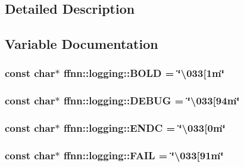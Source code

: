 \subsection{Detailed Description}


\subsection{Variable Documentation}
\hypertarget{group___unicode_color_definitions_ga32fca3fc24af93ce9c4ca33b4a6a3dde}{
\subsubsection[{B\-O\-L\-D}]{\setlength{\rightskip}{0pt plus 5cm}const char$\ast$ ffnn\-::logging\-::\-B\-O\-L\-D = \char`\"{}\textbackslash{}033\mbox{[}1m\char`\"{}}}\label{group___unicode_color_definitions_ga32fca3fc24af93ce9c4ca33b4a6a3dde}
\hypertarget{group___unicode_color_definitions_ga359f39576675d57a59f93e2addae319a}{
\subsubsection[{D\-E\-B\-U\-G}]{\setlength{\rightskip}{0pt plus 5cm}const char$\ast$ ffnn\-::logging\-::\-D\-E\-B\-U\-G = \char`\"{}\textbackslash{}033\mbox{[}94m\char`\"{}}}\label{group___unicode_color_definitions_ga359f39576675d57a59f93e2addae319a}
\hypertarget{group___unicode_color_definitions_gab21e47dcbc216f8fc7de88bd217f9f0a}{
\subsubsection[{E\-N\-D\-C}]{\setlength{\rightskip}{0pt plus 5cm}const char$\ast$ ffnn\-::logging\-::\-E\-N\-D\-C = \char`\"{}\textbackslash{}033\mbox{[}0m\char`\"{}}}\label{group___unicode_color_definitions_gab21e47dcbc216f8fc7de88bd217f9f0a}
\hypertarget{group___unicode_color_definitions_ga2047db0e31e0a45c7c213845567afc06}{
\subsubsection[{F\-A\-I\-L}]{\setlength{\rightskip}{0pt plus 5cm}const char$\ast$ ffnn\-::logging\-::\-F\-A\-I\-L = \char`\"{}\textbackslash{}033\mbox{[}91m\char`\"{}}}\label{group___unicode_color_definitions_ga2047db0e31e0a45c7c213845567afc06}
